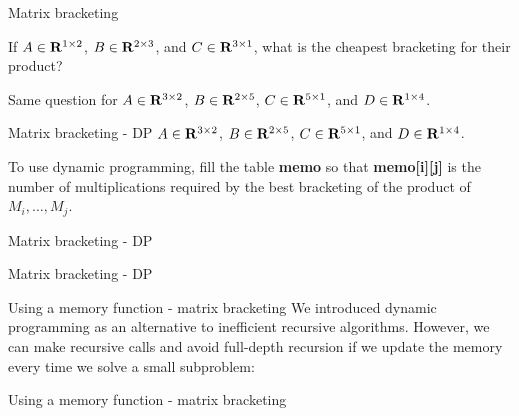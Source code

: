 \documentclass{beamer}
\begin{document}
%

\begin{frame}{Matrix bracketing}
	\begin{exl}
		If $A \in \mathbf{R}^{{1} \times {2}}$, $B \in \mathbf{R}^{{2} \times {3}}$, and $C \in \mathbf{R}^{{3} \times {1}}$,
		what is the cheapest bracketing for their product?
	\end{exl}

	\begin{exl}
		Same question for $A \in \mathbf{R}^{{3} \times {2}}$, $B \in \mathbf{R}^{{2} \times {5}}$,
		$C \in \mathbf{R}^{{5} \times {1}}$, and $D \in \mathbf{R}^{{1} \times {4}}$.
	\end{exl}
\end{frame}

%

\begin{frame}{Matrix bracketing - DP}
	$A \in \mathbf{R}^{{3} \times {2}}$, $B \in \mathbf{R}^{{2} \times {5}}$, $C \in \mathbf{R}^{{5} \times {1}}$, and
	$D \in \mathbf{R}^{{1} \times {4}}$. 

	\bigskip
	To use dynamic programming, fill the table \textbf{memo} so that
	\textbf{memo[i][j]} is the number of multiplications required by the
	best bracketing of the product of $M_i, \ldots, M_j$.
\end{frame}

%

\begin{frame}{Matrix bracketing - DP}
	
\end{frame}

%

\begin{frame}{Matrix bracketing - DP}
	
\end{frame}

%

\begin{frame}{Using a memory function - matrix bracketing}
	We introduced dynamic programming as an alternative to inefficient recursive
	algorithms. However, we can make recursive calls and avoid full-depth
	recursion if we update the memory every time we solve a small subproblem:

	
	
\end{frame}

%

\begin{frame}{Using a memory function - matrix bracketing}
	
\end{frame}
\end{document}
